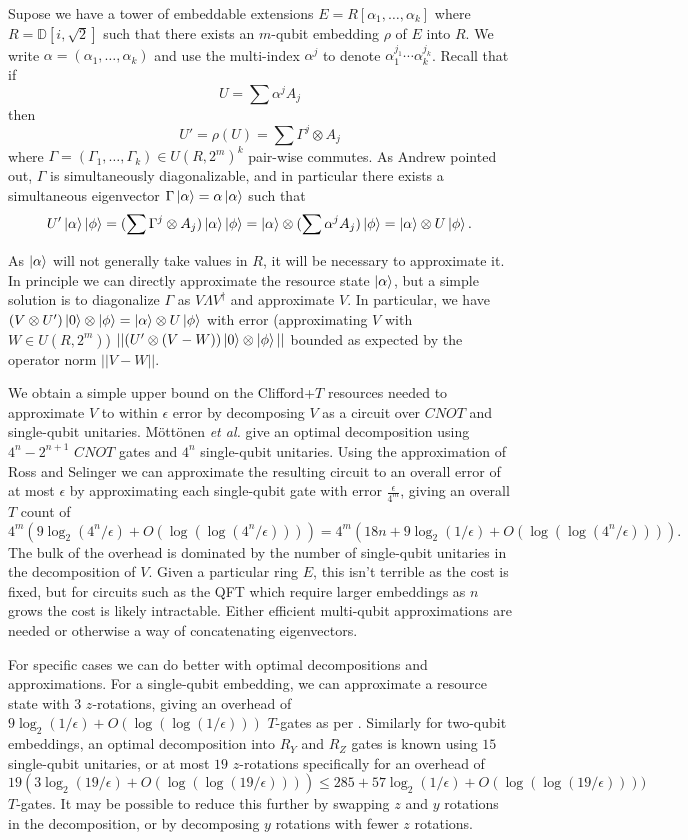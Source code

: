 \documentclass{article}
\theoremstyle{definition}
\theoremstyle{theorem}
\theoremstyle{remark}
\begin{document}
Supose we have a tower of embeddable extensions $E=R[\alpha_1,\dots,\alpha_k]$ where $R=\mathbb{D}[i, \sqrt{2}]$ such that there exists an $m$-qubit embedding $\rho$ of $E$ into $R$. We write $\alpha=(\alpha_1,\dots,\alpha_k)$ and use the multi-index $\alpha^j$ to denote $\alpha_1^{j_1}\cdots \alpha_k^{j_k}$. Recall that if
\[
	U = \sum \alpha^j A_{j}
\]
then 
\[
	U'=\rho(U)=\sum\Gamma^j\otimes A_j
\]
where $\Gamma=(\Gamma_1,\dots,\Gamma_k)\in U(R,2^m)^k$ pair-wise commutes. As Andrew pointed out, $\Gamma$ is simultaneously diagonalizable, and in particular there exists a simultaneous eigenvector $\Gamma\ket{\alpha} = \alpha\ket{\alpha}$ such that
\[
	U'\ket{\alpha}\ket{\phi} 
		= (\sum\Gamma^j\otimes A_j)\ket{\alpha}\ket{\phi} 
		= \ket{\alpha}\otimes (\sum\alpha^jA_j)\ket{\phi} 
		= \ket{\alpha}\otimes U\ket{\phi}.
\]

As $\ket{\alpha}$ will not generally take values in $R$, it will be necessary to approximate it. In principle we can directly approximate the resource state $\ket{\alpha}$, but a simple solution is to diagonalize $\Gamma$ as $V\Lambda V^\dagger$ and approximate $V$. In particular, we have $(V\otimes U')\ket{0}\otimes\ket{\phi} = \ket{\alpha}\otimes U\ket{\phi}$ with error (approximating $V$ with $W\in U(R,2^m)$) $||(U'\otimes(V - W))\ket{0}\otimes\ket{\phi}||$ bounded as expected by the operator norm $||V - W||$.

We obtain a simple upper bound on the Clifford+$T$ resources needed to approximate $V$ to within $\epsilon$ error by decomposing $V$ as a circuit over $CNOT$ and single-qubit unitaries. M\"ott\"onen \textit{et al.} \cite{general} give an optimal decomposition using $4^n-2^{n+1}$ $CNOT$ gates and $4^n$ single-qubit unitaries. Using the approximation of Ross and Selinger \cite{zrot} we can approximate the resulting circuit to an overall error of at most $\epsilon$ by approximating each single-qubit gate with error $\frac{\epsilon}{4^m}$, giving an overall $T$ count of
\[
	4^m(9\log_2(4^n/\epsilon) + O(\log(\log(4^n/\epsilon)))) = 4^m(18n + 9\log_2(1/\epsilon) + O(\log(\log(4^n/\epsilon)))).
\]
The bulk of the overhead is dominated by the number of single-qubit unitaries in the decomposition of $V$. Given a particular ring $E$, this isn't terrible as the cost is fixed, but for circuits such as the QFT which require larger embeddings as $n$ grows the cost is likely intractable. Either efficient multi-qubit approximations are needed or otherwise a way of concatenating eigenvectors.

For specific cases we can do better with optimal decompositions and approximations. For a single-qubit embedding, we can approximate a resource state with $3$ $z$-rotations, giving an overhead of $9\log_2(1/\epsilon) + O(\log(\log(1/\epsilon)))$ $T$-gates as per \cite{zrot}. Similarly for two-qubit embeddings, an optimal decomposition into $R_Y$ and $R_Z$ gates is known using $15$ single-qubit unitaries, or at most $19$ $z$-rotations specifically for an overhead of 
\[
	19(3\log_2(19/\epsilon) + O(\log(\log(19/\epsilon)))) \leq 285 + 57\log_2(1/\epsilon) + O(\log(\log(19/\epsilon))))
\]
$T$-gates. It may be possible to reduce this further by swapping $z$ and $y$ rotations in the decomposition, or by decomposing $y$ rotations with fewer $z$ rotations.
\end{document}

